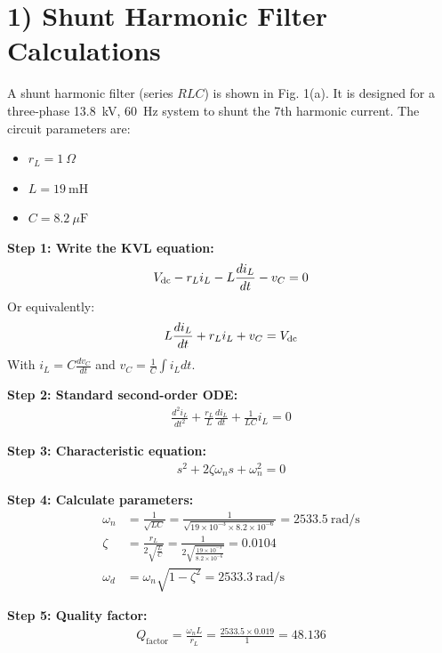 \documentclass{article}
\begin{document}
\section*{1) Shunt Harmonic Filter Calculations}

A shunt harmonic filter (series $RLC$) is shown in Fig. 1(a). It is designed for a three-phase 13.8~kV, 60~Hz system to shunt the 7th harmonic current. The circuit parameters are:
\begin{itemize}
    \item $r_L = 1~\Omega$
    \item $L = 19~\text{mH}$
    \item $C = 8.2~\mu\text{F}$
\end{itemize}

\textbf{Step 1: Write the KVL equation:}
\begin{align*}
    V_{\rm dc} - r_L i_L - L \frac{di_L}{dt} - v_C = 0
\end{align*}
Or equivalently:
\begin{align*}
    L \frac{d i_L}{dt} + r_L i_L + v_C = V_{\rm dc}
\end{align*}
With $i_L = C \frac{dv_C}{dt}$ and $v_C = \frac{1}{C} \int i_L dt$.

\textbf{Step 2: Standard second-order ODE:}
\begin{align*}
    \frac{d^2 i_L}{dt^2} + \frac{r_L}{L} \frac{d i_L}{dt} + \frac{1}{LC} i_L = 0
\end{align*}

\textbf{Step 3: Characteristic equation:}
\begin{align*}
    s^2 + 2\zeta \omega_n s + \omega_n^2 = 0
\end{align*}

\textbf{Step 4: Calculate parameters:}
\begin{align*}
    \omega_n &= \frac{1}{\sqrt{LC}} = \frac{1}{\sqrt{19 \times 10^{-3} \times 8.2 \times 10^{-6}}} = 2533.5~\text{rad/s} \\
    \zeta &= \frac{r_L}{2 \sqrt{\frac{L}{C}}} = \frac{1}{2 \sqrt{\frac{19 \times 10^{-3}}{8.2 \times 10^{-6}}}} = 0.0104 \\
    \omega_d &= \omega_n \sqrt{1-\zeta^2} = 2533.3~\text{rad/s}
\end{align*}

\textbf{Step 5: Quality factor:}
\begin{align*}
    Q_{\text{factor}} = \frac{\omega_n L}{r_L} = \frac{2533.5 \times 0.019}{1} = 48.136
\end{align*}
\end{document}
